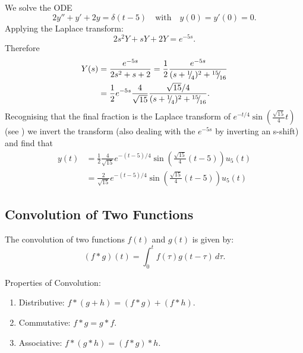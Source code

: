 \begin{eg}
	We solve the ODE
	\[
	2y''+y'+2y=\delta(t-5) \quad\text{with}\quad y(0)=y'(0)=0.
	\]
	Applying the Laplace transform:
	\[
	2s^2Y + sY + 2Y = e^{-5s}.
	\]
	Therefore
	\begin{align*}
		Y(s) &= \frac{e^{-5s}}{2s^2+s+2} = \frac12 \frac{e^{-5s}}{(s+{}^{1}{\mskip -5mu/\mskip -3mu}_{4})^2+{}^{15}{\mskip -5mu/\mskip -3mu}_{16}} \\
		&= \frac12 e^{-5s} \frac{4}{\sqrt{15}} \frac{\sqrt{15}/4}{(s+{}^{1}{\mskip -5mu/\mskip -3mu}_{4})^2+{}^{15}{\mskip -5mu/\mskip -3mu}_{16}}.
	\end{align*}
	Recognising that the final fraction is the Laplace transform of $e^{-t/4}\sin\left(\frac{\sqrt{15}}{4}t\right)$ (see ) we invert the transform (also dealing with the $e^{-5s}$ by inverting an s-shift) and find that
	\begin{align*}
		y(t) &= \frac12 \frac{4}{\sqrt{15}} e^{-(t-5)/4} \sin\left(\frac{\sqrt{15}}{4}(t-5)\right) u_5(t) \\
		&= \frac{2}{\sqrt{15}} e^{-(t-5)/4} \sin\left(\frac{\sqrt{15}}{4}(t-5)\right) u_5(t)
	\end{align*}
\end{eg}


\subsection{Convolution of Two Functions}

The convolution of two functions $f(t)$ and $g(t)$ is given by:
\begin{equation}
	(f * g)(t) = \int_0^t f(\tau)g(t - \tau) \,d\tau.
\end{equation}

Properties of Convolution:
\begin{enumerate}
	\item Distributive: $f*(g+h) = (f*g)+(f*h)$.
	\item Commutative: $f*g = g*f$.
	\item Associative: $f*(g*h) = (f*g)*h$.
\end{enumerate}

